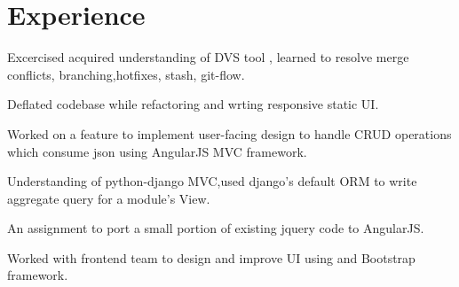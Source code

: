 \documentclass[hidelinks]{deedy-resume-openfont}
\renewcommand{\sectionsep}[0]{\vspace{8pt}}
\begin{document}
\begin{minipage}[t]{0.33\textwidth}





%

\end{minipage}
\hfill
\begin{minipage}[t]{0.66\textwidth}


\section{Experience}

\vspace{\topsep} %
\begin{tightemize}
\item  Excercised acquired understanding of DVS tool , learned to resolve merge conflicts, branching,hotfixes, stash, git-flow.
\item Deflated codebase while refactoring and wrting responsive static UI.
\item  Worked on a feature to implement user-facing design to handle CRUD
operations which consume json using AngularJS MVC framework.
\item Understanding of python-django MVC,used django's default ORM to write
  aggregate query for a module's View.
\item An assignment to port a small portion of existing jquery code to AngularJS.
\end{tightemize}
\sectionsep

\begin{tightemize}
\item Worked with frontend team to design and improve UI using  and Bootstrap framework.
\end{tightemize}
\sectionsep


\end{minipage}
\end{document}

